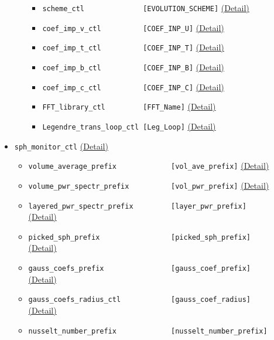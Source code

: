 \begin{itemize}
\begin{itemize}
\begin{itemize}
		\item \verb|scheme_ctl              [EVOLUTION_SCHEME]|
	    		\hyperref[href_t:scheme_ctl]{(Detail)}
		\item \verb|coef_imp_v_ctl          [COEF_INP_U]|
	    		\hyperref[href_t:coef_imp_v_ctl]{(Detail)}
		\item \verb|coef_imp_t_ctl          [COEF_INP_T]|
	    		\hyperref[href_t:coef_imp_t_ctl]{(Detail)}
		\item \verb|coef_imp_b_ctl          [COEF_INP_B]|
	    		\hyperref[href_t:coef_imp_b_ctl]{(Detail)}
		\item \verb|coef_imp_c_ctl          [COEF_INP_C]|
	    		\hyperref[href_t:coef_imp_c_ctl]{(Detail)}
		\item \verb|FFT_library_ctl         [FFT_Name]|
	    		\hyperref[href_t:FFT_library_ctl]{(Detail)}
		\item \verb|Legendre_trans_loop_ctl [Leg_Loop]|
	    		\hyperref[href_t:Legendre_trans_loop_ctl]{(Detail)}
		\end{itemize}
%
	\end{itemize}
%
\item \verb|sph_monitor_ctl|
	\label{href_i:sph_monitor_ctl}
	\hyperref[href_t:sph_monitor_ctl]{(Detail)}
	\begin{itemize}
	\item \verb|volume_average_prefix             [vol_ave_prefix]|
    		\hyperref[href_t:volume_average_prefix]{(Detail)}
	\item \verb|volume_pwr_spectr_prefix          [vol_pwr_prefix]|
    		\hyperref[href_t:volume_pwr_spectr_prefix]{(Detail)}
	\item \verb|layered_pwr_spectr_prefix         [layer_pwr_prefix]| \\
    		\hyperref[href_t:layered_pwr_spectr_prefix]{(Detail)}
	\item \verb|picked_sph_prefix                 [picked_sph_prefix]| \\
    		\hyperref[href_t:picked_sph_prefix]{(Detail)}
	\item \verb|gauss_coefs_prefix                [gauss_coef_prefix]| \\
    		\hyperref[href_t:gauss_coefs_prefix]{(Detail)}
	\item \verb|gauss_coefs_radius_ctl            [gauss_coef_radius]| \\
    		\hyperref[href_t:gauss_coefs_radius_ctl]{(Detail)}
	\item \verb|nusselt_number_prefix             [nusselt_number_prefix]| \\

\end{itemize}
\end{itemize}
